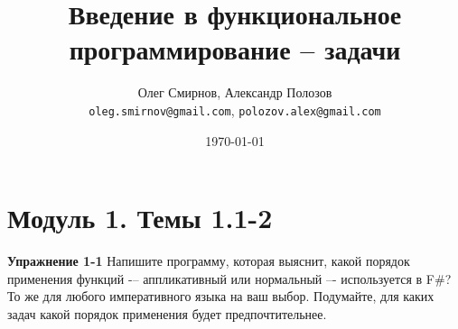 \documentclass[a4paper,11pt]{article}
\author{Олег Смирнов, Александр Полозов \\
\texttt{oleg.smirnov@gmail.com}, \texttt{polozov.alex@gmail.com}}
\date{\today}
\title{Введение в функциональное программирование -- задачи}
\begin{document}
\section*{Модуль 1. Темы 1.1-2}
\textbf{Упражнение 1-1} Напишите программу, которая выяснит, какой порядок
применения функций -– аппликативный или нормальный –- используется в F\#? То же
для любого императивного языка на ваш выбор. Подумайте, для каких задач какой
порядок применения будет предпочтительнее.
\end{document}
